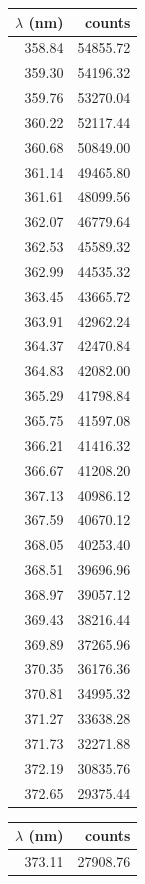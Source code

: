 \begin{table}[!h]
\begin{tabular}{rr}
\toprule
 $\lambda$ (nm) &    counts \\
\midrule   
          358.84 &  54855.72 \\
          359.30 &  54196.32 \\
          359.76 &  53270.04 \\
          360.22 &  52117.44 \\
          360.68 &  50849.00 \\
          361.14 &  49465.80 \\
          361.61 &  48099.56 \\
          362.07 &  46779.64 \\
          362.53 &  45589.32 \\
          362.99 &  44535.32 \\
          363.45 &  43665.72 \\
          363.91 &  42962.24 \\
          364.37 &  42470.84 \\
          364.83 &  42082.00 \\
          365.29 &  41798.84 \\
          365.75 &  41597.08 \\
          366.21 &  41416.32 \\
          366.67 &  41208.20 \\
          367.13 &  40986.12 \\
          367.59 &  40670.12 \\
          368.05 &  40253.40 \\
          368.51 &  39696.96 \\
          368.97 &  39057.12 \\
          369.43 &  38216.44 \\
          369.89 &  37265.96 \\
          370.35 &  36176.36 \\
          370.81 &  34995.32 \\
          371.27 &  33638.28 \\
          371.73 &  32271.88 \\
          372.19 &  30835.76 \\
          372.65 &  29375.44 \\ 
\bottomrule
\end{tabular}
\begin{tabular}{rr}
\toprule
 $\lambda$ (nm) &    counts \\
\midrule   
          373.11 &  27908.76 \\

\end{tabular}
\end{table}
